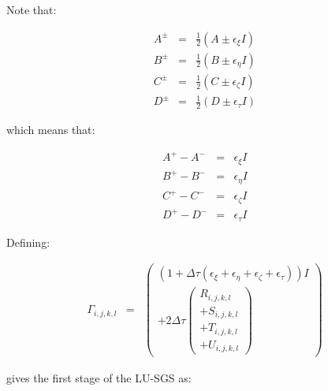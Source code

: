 Note that:

\begin{eqnarray}
A^{\pm} &=& \frac{1}{2} \left(A \pm \epsilon_{\xi} I \right)
\nonumber
\\
B^{\pm} &=& \frac{1}{2} \left(B \pm \epsilon_{\eta} I \right)
\nonumber
\\
C^{\pm} &=& \frac{1}{2} \left(C \pm \epsilon_{\zeta} I \right)
\nonumber
\\
D^{\pm} &=& \frac{1}{2} \left(D \pm \epsilon_{\tau} I \right)
\nonumber
\end{eqnarray}

which means that:

\begin{eqnarray}
A^+ - A^-
&=&
\epsilon_{\xi} I
\nonumber
\\
B^+ - B^-
&=&
\epsilon_{\eta} I
\nonumber
\\
C^+ - C^-
&=&
\epsilon_{\zeta} I
\nonumber
\\
D^+ - D^-
&=&
\epsilon_{\tau} I
\nonumber
\end{eqnarray}

Defining:

\begin{eqnarray}
\Gamma_{i,j,k,l}
&=&
\left(
\begin{array}{c}
\left(
1
+ \Delta \tau 
\left(
\epsilon_{\xi}
+
\epsilon_{\eta}
+ 
\epsilon_{\zeta}
+ 
\epsilon_{\tau}
\right)
\right) I
\\
+
2 \Delta \tau
\left(
\begin{array}{r}
  R_{i,j,k,l} 
\\
+ S_{i,j,k,l} 
\\
+ T_{i,j,k,l} 
\\
+ U_{i,j,k,l} 
\end{array}
\right)
\end{array}
\right) 
\nonumber
\end{eqnarray}


gives the first stage of the LU-SGS as:

